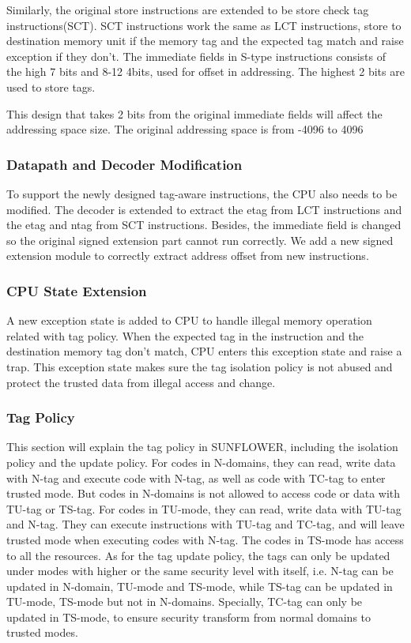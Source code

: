 \documentclass[conference]{IEEEtran}
\begin{document}
Similarly, the original store instructions are extended to be store check tag instructions(SCT). SCT instructions work the same as LCT instructions, store to destination memory unit if the memory tag and the expected tag match and raise exception if they don't. The immediate fields in S-type instructions consists of the high 7 bits and 8-12 4bits, used for offset in addressing. The highest 2 bits are used to store tags. 

This design that takes 2 bits from the original immediate fields will affect the addressing space size. The original addressing space is from -4096 to 4096


\subsubsection{Datapath and Decoder Modification}
To support the newly designed tag-aware instructions, the CPU also needs to be modified. The decoder is extended to extract the etag from LCT instructions and the etag and ntag from SCT instructions. Besides, the immediate field is changed so the original signed extension part cannot run correctly. We add a new signed extension module to correctly extract address offset from new instructions.

\subsubsection{CPU State Extension}
A new exception state is added to CPU to handle illegal memory operation related with tag policy. When the expected tag in the instruction and the destination memory tag don't match, CPU enters this exception state and raise a trap. This exception state makes sure the tag isolation policy is not abused and protect the trusted data from illegal access and change. 

\subsubsection{Tag Policy}
This section will explain the tag policy in SUNFLOWER, including the isolation policy and the update policy. For codes in N-domains, they can read, write data with N-tag and execute code with N-tag, as well as code with TC-tag to enter trusted mode. But codes in N-domains is not allowed to access code or data with TU-tag or TS-tag. For codes in TU-mode, they can read, write data with TU-tag and N-tag. They can execute instructions with TU-tag and TC-tag, and will leave trusted mode when executing codes with N-tag. The codes in TS-mode has access to all the resources. As for the tag update policy, the tags can only be updated under modes with higher or the same security level with itself, i.e. N-tag can be updated in N-domain, TU-mode and TS-mode, while TS-tag can be updated in TU-mode, TS-mode but not in N-domains. Specially, TC-tag can only be updated in TS-mode, to ensure security transform from normal domains to trusted modes. 
\end{document}
